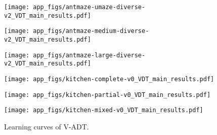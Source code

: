 \begin{figure}[!htbp]
\begin{minipage}[t]{0.3\textwidth}
\centering
\texttt{[image: app\_figs/antmaze-umaze-diverse-v2\_VDT\_main\_results.pdf]}
\end{minipage}
\begin{minipage}[t]{0.3\textwidth}
\centering
\texttt{[image: app\_figs/antmaze-medium-diverse-v2\_VDT\_main\_results.pdf]}
\end{minipage}
\begin{minipage}[t]{0.3\textwidth}
\centering
\texttt{[image: app\_figs/antmaze-large-diverse-v2\_VDT\_main\_results.pdf]}
\end{minipage}

\begin{minipage}[t]{0.3\textwidth}
\centering
\texttt{[image: app\_figs/kitchen-complete-v0\_VDT\_main\_results.pdf]}
\end{minipage}
\begin{minipage}[t]{0.3\textwidth}
\centering
\texttt{[image: app\_figs/kitchen-partial-v0\_VDT\_main\_results.pdf]}
\end{minipage}
\begin{minipage}[t]{0.3\textwidth}
\centering
\texttt{[image: app\_figs/kitchen-mixed-v0\_VDT\_main\_results.pdf]}
\end{minipage}



\caption{Learning curves of V-ADT.}
\label{fig:learning_curves}
\end{figure}


